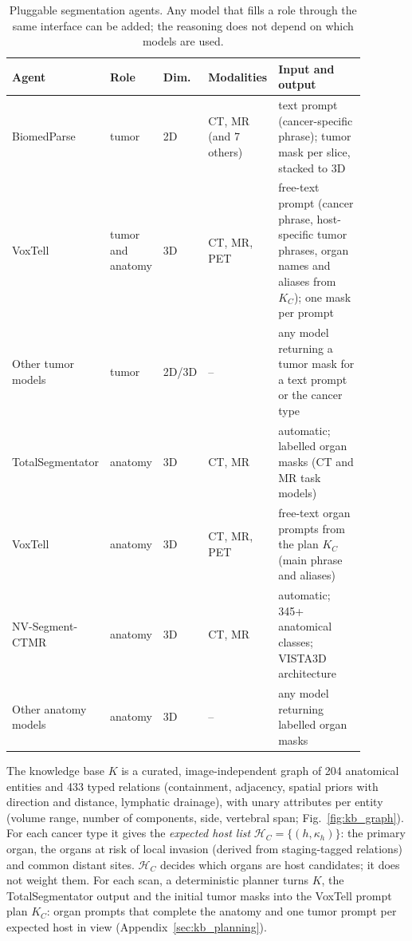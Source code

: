 \documentclass[fleqn,10pt]{olplainarticle}
\begin{document}
\begin{table}[t]
\centering\small
\caption{Pluggable segmentation agents. Any model that fills a role through the same interface can be added; the
reasoning does not depend on which models are used.}
\label{tab:agents}
\begin{tabular}{p{0.17\linewidth}p{0.13\linewidth}p{0.1\linewidth}p{0.12\linewidth}p{0.36\linewidth}}
\hline
Agent & Role & Dim. & Modalities & Input and output\\
\hline
BiomedParse \cite{zhao2025biomedparse} & tumor & 2D & CT, MR (and 7 others) & text prompt (cancer-specific phrase); tumor mask per slice, stacked to 3D\\
VoxTell \cite{rokuss2025voxtell} & tumor and anatomy & 3D & CT, MR, PET & free-text prompt (cancer phrase, host-specific tumor phrases, organ names and aliases from $K_C$); one mask per prompt\\
Other tumor models & tumor & 2D/3D & -- & any model returning a tumor mask for a text prompt or the cancer type\\
\hline
TotalSegmentator \cite{wasserthal2023totalsegmentator,dantonoli2025totalsegmentatormri} & anatomy & 3D & CT, MR & automatic; labelled organ masks (CT and MR task models)\\
VoxTell \cite{rokuss2025voxtell} & anatomy & 3D & CT, MR, PET & free-text organ prompts from the plan $K_C$ (main phrase and aliases)\\
NV-Segment-CTMR \cite{nvsegmentctmr,he2025vista3d} & anatomy & 3D & CT, MR & automatic; 345+ anatomical classes; VISTA3D architecture\\
Other anatomy models & anatomy & 3D & -- & any model returning labelled organ masks\\
\hline
\end{tabular}
\end{table}

The knowledge base $K$ is a curated, image-independent graph of 204 anatomical entities and 433 typed relations
(containment, adjacency, spatial priors with direction and distance, lymphatic drainage), with unary attributes per
entity (volume range, number of components, side, vertebral span; Fig.~\ref{fig:kb_graph}). For each cancer type it gives
the \emph{expected host list} $\mathcal{H}_C=\{(h,\kappa_h)\}$: the primary organ, the organs at risk of local invasion
(derived from staging-tagged relations) and common distant sites. $\mathcal{H}_C$ decides which organs are host
candidates; it does not weight them. For each scan, a deterministic planner turns $K$, the TotalSegmentator output and the
initial tumor masks into the VoxTell prompt plan $K_C$: organ prompts that complete the anatomy and one tumor prompt per
expected host in view (Appendix~\ref{sec:kb_planning}).
\end{document}

